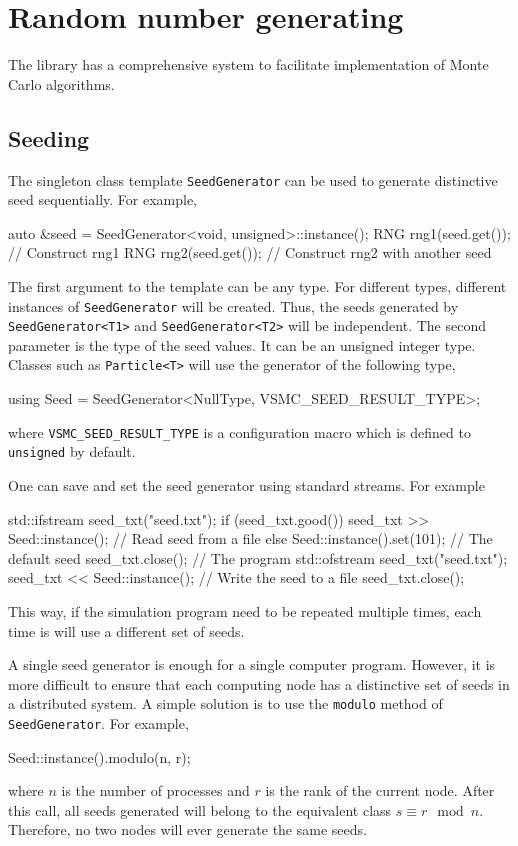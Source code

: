 \chapter{Random number generating}
\label{chap:Random number generating}

The library has a comprehensive \rng system to facilitate implementation of
Monte Carlo algorithms.

\section{Seeding}
\label{sec:Seeding}

The singleton class template \verb|SeedGenerator| can be used to generate
distinctive seed sequentially. For example,
\begin{cppcode}
  auto &seed = SeedGenerator<void, unsigned>::instance();
  RNG rng1(seed.get()); // Construct rng1
  RNG rng2(seed.get()); // Construct rng2 with another seed
\end{cppcode}
The first argument to the template can be any type. For different types,
different instances of \verb|SeedGenerator| will be created. Thus, the seeds
generated by \verb|SeedGenerator<T1>| and \verb|SeedGenerator<T2>| will be
independent. The second parameter is the type of the seed values. It can be an
unsigned integer type. Classes such as \verb|Particle<T>| will use the
generator of the following type,
\begin{cppcode}
  using Seed = SeedGenerator<NullType, VSMC_SEED_RESULT_TYPE>;
\end{cppcode}
where \verb|VSMC_SEED_RESULT_TYPE| is a configuration macro which is defined to
\verb|unsigned| by default.

One can save and set the seed generator using standard \cpp streams. For
example
\begin{cppcode}
  std::ifstream seed_txt("seed.txt");
  if (seed_txt.good())
      seed_txt >> Seed::instance(); // Read seed from a file
  else
      Seed::instance().set(101);    // The default seed
  seed_txt.close();
  // The program
  std::ofstream seed_txt("seed.txt");
  seed_txt << Seed::instance();     // Write the seed to a file
  seed_txt.close();
\end{cppcode}
This way, if the simulation program need to be repeated multiple times, each
time is will use a different set of seeds.

A single seed generator is enough for a single computer program. However, it is
more difficult to ensure that each computing node has a distinctive set of
seeds in a distributed system. A simple solution is to use the \verb|modulo|
method of \verb|SeedGenerator|. For example,
\begin{cppcode}
  Seed::instance().modulo(n, r);
\end{cppcode}
where $n$ is the number of processes and $r$ is the rank of the current node.
After this call, all seeds generated will belong to the equivalent class $s
\equiv r\mod{n}$. Therefore, no two nodes will ever generate the same seeds.

